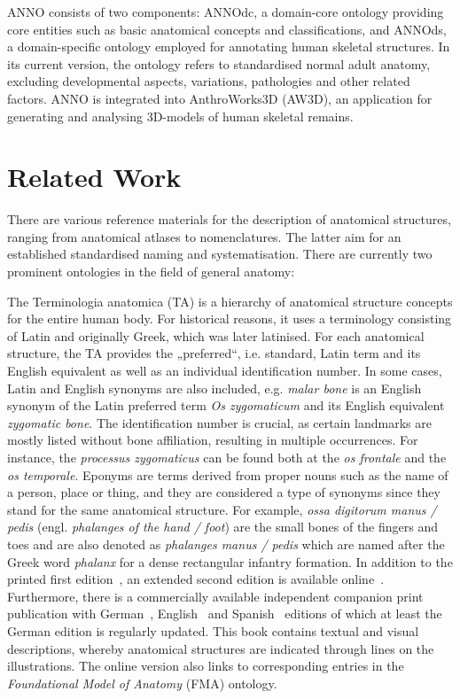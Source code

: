 \documentclass[sw]{iosart2x}
\begin{document}
ANNO consists of two components: ANNOdc, a domain-core ontology providing core entities such as basic anatomical concepts and classifications, and ANNOds, a domain-specific ontology employed for annotating human skeletal structures. In its current version, the ontology  refers to standardised normal adult anatomy, excluding developmental aspects, variations, pathologies and other related factors. ANNO is integrated into AnthroWorks3D (AW3D), an application for generating and analysing 3D-models of human skeletal remains. 


\section{Related Work}

There are various reference materials for the description of anatomical structures, ranging from anatomical atlases to nomenclatures.
The latter aim for an established standardised naming and systematisation.
There are currently two prominent ontologies in the field of general anatomy:

The Terminologia anatomica (TA) is a hierarchy of anatomical structure concepts for the entire human body.
For historical reasons, it uses a terminology consisting of Latin and originally Greek, which was later latinised.
For each anatomical structure, the TA provides the „preferred“, i.e. standard, Latin term and its English equivalent as well as an individual identification number.
In some cases, Latin and English synonyms are also included, e.g. \emph{malar bone} is an English synonym of the Latin preferred term \emph{Os zygomaticum} and its English equivalent \emph{zygomatic bone}.
The identification number is crucial, as certain landmarks are mostly listed without bone affiliation, resulting in multiple occurrences. %
For instance, the \emph{processus zygomaticus} can be found both at the \emph{os frontale} and the \emph{os temporale}.
Eponyms are terms derived from proper nouns such as the name of a person, place or thing, and they are considered a type of synonyms since they stand for the same anatomical structure.
For example, \emph{ossa digitorum manus / pedis} (engl. \emph{phalanges of the hand / foot}) are the small bones of the fingers and toes and are also denoted as \emph{phalanges manus / pedis} which are named after the Greek word \emph{phalanx} for a dense rectangular infantry formation.
In addition to the printed first edition~\citep{ta1998}, an extended second edition is available online~\citep{ta2}.
Furthermore, there is a commercially available independent companion print publication with German~\citep{anatomylexicon}, English~\citep{pocketatlas} and Spanish~\citep{taspanish} editions of which at least the German edition is regularly updated.
This book contains textual and visual descriptions, whereby anatomical structures are indicated through lines on the illustrations.
The online version also links to corresponding entries in the \emph{Foundational Model of Anatomy} (FMA) ontology.
\end{document}
